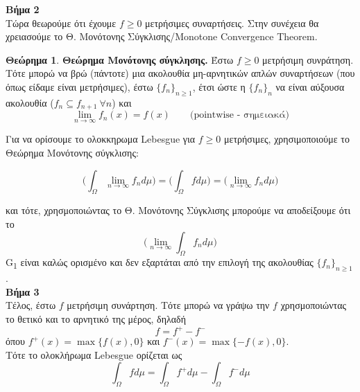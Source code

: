 \documentclass[12pt,a4paper]{article}
\theoremstyle{definition}
\numberwithin{equation}{section}
\newtheorem{theorima}{Θεώρημα}
\begin{document}
{\textbf{Bήμα 2}\\
Τώρα θεωρούμε ότι έχουμε \(f\geq 0\) μετρήσιμες συναρτήσεις. Στην συνέχεια θα χρειασούμε το Θ. Μονότονης Σύγκλισης/Monotone Convergence Theorem.

\begin{theorima}\textbf{Θεώρημα Μονότονης σύγκλησης.} Έστω $f\geq 0$ μετρήσιμη συνράτηση. Τότε μπορώ να βρώ (πάντοτε) μια ακολουθία μη-αρνητικών απλών συναρτήσεων (που όπως
είδαμε είναι μετρήσιμες), έστω $\{f_n\}_{n\geq 1}$, έτσι ώστε η $\{f_n\}_n$ να είναι αύξουσα ακολουθία ($f_n \subseteq f_{n+1}\: \forall n$) και
$$\lim_{n\rightarrow \infty} f_n(x) = f(x) \qquad \text{(pointwise - σημειακά)}$$
\end{theorima}
\pagebreak

Για να ορίσουμε το ολοκκηρωμα Lebesgue για \(f\geq 0\) μετρήσιμες, χρησιμοποιούμε το Θεώρημα Μονότονης σύγκλισης:

$$ \Big( \int_\Omega \lim_{n\rightarrow \infty} f_n d\mu \Big) = \Big( \int_\Omega f d\mu \Big) = \Big( \lim_{n\rightarrow \infty} f_n d\mu \Big) $$

και τότε, χρησμοποιώντας το Θ. Μονότονης Σύγκλισης μπορούμε να αποδείξουμε ότι το
$$\Big( \lim_{n\rightarrow \infty} \int_\Omega f_n d\mu \Big)$$G\textsubscript{1}
είναι καλώς ορισμένο και δεν εξαρτάται από την επιλογή της ακολουθίας \(\{f_n\}_{n\geq 1}\).\\

\textbf{Βήμα 3}\\
Τέλος, έστω \(f\) μετρήσιμη συνάρτηση. Τότε μπορώ να γράψω την \(f\) χρησμοποιώντας το θετικό και το αρνητικό της μέρος, δηλαδή
$$ f = f^+ - f^-$$
όπου \(f^+(x)= \max \{ f(x), 0\}\) και \(f^-(x) = \max \{-f(x),0\}\).\\
Τότε το ολοκλήρωμα Lebesgue ορίζεται ως
$$\int_\Omega f d\mu = \int_\Omega f^+ d\mu - \int_\Omega f^- d\mu $$
\pagebreak

}
\end{document}
